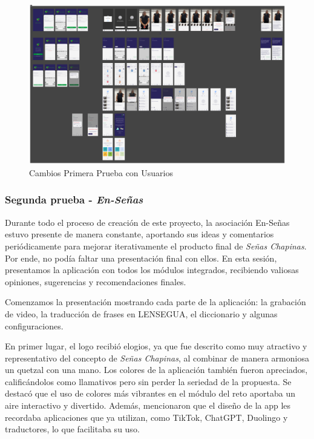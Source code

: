 \begin{figure} [H]
    \centering
    \includegraphics[width=1\linewidth]{figuras/prototipo_cambios1.png}
    \caption{Cambios Primera Prueba con Usuarios}
    \label{fig:enter-label}
\end{figure}


\subsubsection{Segunda prueba - \textit{En-Señas}}


Durante todo el proceso de creación de este proyecto, la asociación En-Señas estuvo presente de manera constante, aportando sus ideas y comentarios periódicamente para mejorar iterativamente el producto final de \textit{Señas Chapinas}. Por ende, no podía faltar una presentación final con ellos. En esta sesión, presentamos la aplicación con todos los módulos integrados, recibiendo valiosas opiniones, sugerencias y recomendaciones finales.

Comenzamos la presentación mostrando cada parte de la aplicación: la grabación de video, la traducción de frases en LENSEGUA, el diccionario y algunas configuraciones. 

En primer lugar, el logo recibió elogios, ya que fue descrito como muy atractivo y representativo del concepto de \textit{Señas Chapinas}, al combinar de manera armoniosa un quetzal con una mano. Los colores de la aplicación también fueron apreciados, calificándolos como llamativos pero sin perder la seriedad de la propuesta. Se destacó que el uso de colores más vibrantes en el módulo del reto aportaba un aire interactivo y divertido. Además, mencionaron que el diseño de la app les recordaba aplicaciones que ya utilizan, como TikTok, ChatGPT, Duolingo y traductores, lo que facilitaba su uso.

